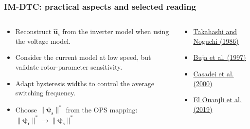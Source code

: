 \begin{frame}
    \frametitle{IM-DTC: practical aspects and selected reading}
    \begin{columns}[T,onlytextwidth]
        \begin{column}{0.50\textwidth}
            \begin{tcolorbox}[enhanced,arc=1mm,boxrule=0pt,frame hidden,drop fuzzy shadow=black!70,colback=gray!12,colbacktitle=defaultcolor,title={Implementation remarks},fonttitle=\normalsize,left=1mm,right=1mm,top=1mm,bottom=1mm]
                \begin{itemize}
                    \item Reconstruct $\hat{\bm{u}}_\mathrm{s}$ from the inverter model when using the voltage model.
                    \item<2-> Consider the current model at low speed, but validate rotor-parameter sensitivity.
                    \item<3-> Adapt hysteresis widths to control the average switching frequency.
                    \item<4-> Choose $\|\bm{\psi}_\mathrm{s}\|^*$ from the OPS mapping: $\|\bm{\psi}_\mathrm{r}\|^* \rightarrow\|\bm{\psi}_\mathrm{s}\|^*$
                \end{itemize}
            \end{tcolorbox}
        \end{column}
        \begin{column}{0.49\textwidth}
            \begin{tcolorbox}[enhanced,arc=1mm,boxrule=0pt,frame hidden,drop fuzzy shadow=black!70,colback=gray!12,colbacktitle=defaultcolor,title={Selected reading},fonttitle=\normalsize,left=1mm,right=1mm,top=1mm,bottom=1mm]
                \begin{itemize}
                    \item \href{https://doi.org/10.1109/TIA.1986.4504799}{Takahashi and Noguchi (1986)}
                    \item \href{https://doi.org/10.1109/ISIE.1997.651717}{Buja et al. (1997)}
                    \item \href{https://doi.org/10.1109/63.849048}{Casadei et al. (2000)}
                    \item \href{https://doi.org/10.1186/s41601-019-0125-5}{El Ouanjli et al. (2019)}
                \end{itemize}
            \end{tcolorbox}
        \end{column}
    \end{columns}
\end{frame}
